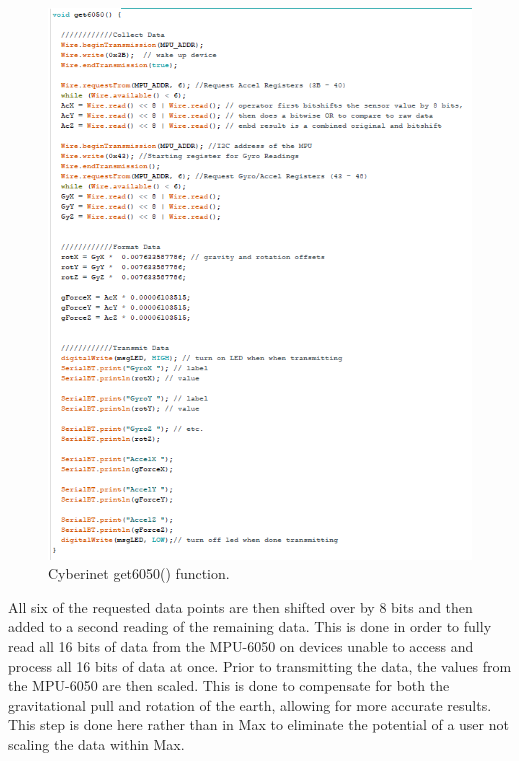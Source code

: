 \begin{center}
    \begin{figure}
        \centering
        \includegraphics[scale=1.5]{diagrams/maxPatches/get6050.png}
        \caption{Cyberinet get6050() function.}
        \label{fig:get6050}
    \end{figure}
\end{center}

All six of the requested data points are then shifted over by 8 bits and then added to a second reading of the remaining data. This is done in order to fully read all 16 bits of data from the MPU-6050 on devices unable to access and process all 16 bits of data at once. Prior to transmitting the data, the values from the MPU-6050 are then scaled. This is done to compensate for both the gravitational pull and rotation of the earth, allowing for more accurate results. This step is done here rather than in Max to eliminate the potential of a user not scaling the data within Max.


